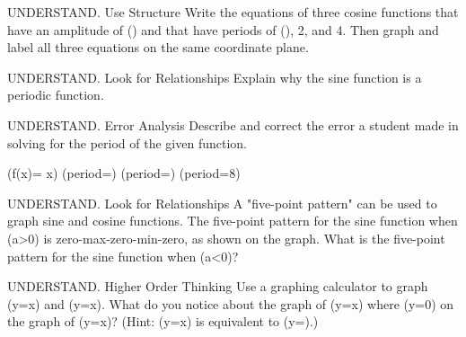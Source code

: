 \documentclass{article}
\newenvironment{practice}[2]{}{}        %
\newcommand{\answer}[1]{}               %
\newcommand{\placeholder}[2]{}          %
\newcommand{\te}[1]{}                   %
\begin{document}
\begin{practice}{8}{2}
UNDERSTAND. Use Structure Write the equations of three cosine functions that have an amplitude of () and that have periods of (), 2, and 4. Then graph and label all three equations on the same coordinate plane.
\answer{period(\frac12): (y=\frac12\cos(4\pi x)); period2: (y=\frac12\cos(\pi x)); period4: (y=\frac12\cos(\frac\pi2 x))}
\placeholder{graph}{Three cosine graphs with arrowed x,y axes, origin O; x labels-pi,pi, gridpi/4; y labels-1,-0.5,0.5,1, grid1/4; window-2pi to2pi,-5/4 to5/4. Red y=1/2 cos4pi x period1/2; blue y=1/2 cos pi x period2; green y=1/2 cos(pi/2)x period4. All share maximum(0,1/2), minima -1/2; all have end arrows and colored equation labels.}
\end{practice}
\begin{practice}{9}{2}
UNDERSTAND. Look for Relationships Explain why the sine function is a periodic function.
\answer{The sine function is a periodic function because the outputs repeat after a constant interval of inputs, (2\pi) radians.}
\end{practice}
\begin{practice}{10}{2}
UNDERSTAND. Error Analysis Describe and correct the error a student made in solving for the period of the given function.
\te{Student work, marked with a red X:}
(f(x)=\sin{} x)
(period=)
(period=\times{})
(period=8\pi)
\answer{The student used the value of a instead of the value of b in the formula for the period of a function. The period is (3\pi).}
\end{practice}
\begin{practice}{11}{2}
UNDERSTAND. Look for Relationships A "five-point pattern" can be used to graph sine and cosine functions. The five-point pattern for the sine function when (a>0) is zero-max-zero-min-zero, as shown on the graph. What is the five-point pattern for the sine function when (a<0)?
\placeholder{graph}{Red sine wave on arrowed x,y axes, O; x labels-2pi,-pi,pi,2pi, gridpi/4; y labels-1,1 grid1/4; window-9pi/4 to9pi/4,-5/4 to5/4. Red filled points labeled zero at(0,0),(pi,0),(2pi,0), max at(pi/2,1), min at(3pi/2,-1). Curve end arrows.}
\answer{zero-min-zero-max-zero}
\end{practice}
\begin{practice}{12}{3}
UNDERSTAND. Higher Order Thinking Use a graphing calculator to graph (y=\sin x) and (y=\csc x). What do you notice about the graph of (y=\csc x) where (y=0) on the graph of (y=\sin x)? (Hint: (y=\csc x) is equivalent to (y=).)
\answer{The graph of (y=\csc x) is undefined where (y=0) on the graph of (y=\sin x).}
\end{practice}
\end{document}
